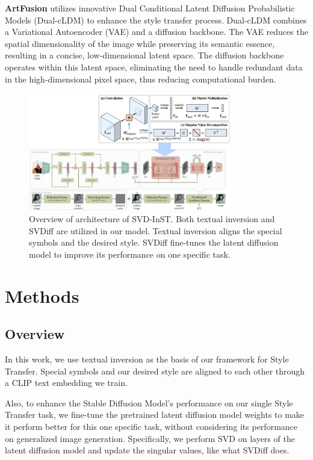 \documentclass[conference]{IEEEtran}
\begin{document}
\textbf{ArtFusion}\cite{artfusion} utilizes innovative Dual Conditional Latent Diffusion Probabilistic Models (Dual-cLDM) to enhance the style transfer process. Dual-cLDM combines a Variational Autoencoder (VAE) and a diffusion backbone. The VAE reduces the spatial dimensionality of the image while preserving its semantic essence, resulting in a concise, low-dimensional latent space. The diffusion backbone operates within this latent space, eliminating the need to handle redundant data in the high-dimensional pixel space, thus reducing computational burden.

\begin{figure}[!t]
\centering
\includegraphics[width=3.5in]{SVD-InST.png}
\caption{Overview of architecture of SVD-InST. 
Both textual inversion and SVDiff are utilized in our model. Textual inversion aligns the special symbols and the desired style. SVDiff fine-tunes the latent diffusion model to improve its performance on one specific task.}
\label{approach_svd}
\end{figure}

\section{Methods}

\subsection{Overview}


In this work, we use textual inversion as the basis of our framework for Style Transfer. Special symbols and our desired style are aligned to each other through a CLIP text embedding we train.

Also, to enhance the Stable Diffusion Model's performance on our single Style Transfer task, we fine-tune the pretrained latent diffusion model weights to make it perform better for this one specific task, without considering its performance on generalized image generation. Specifically, we perform SVD on layers of the latent diffusion model and update the singular values, like what SVDiff does.
\end{document}
